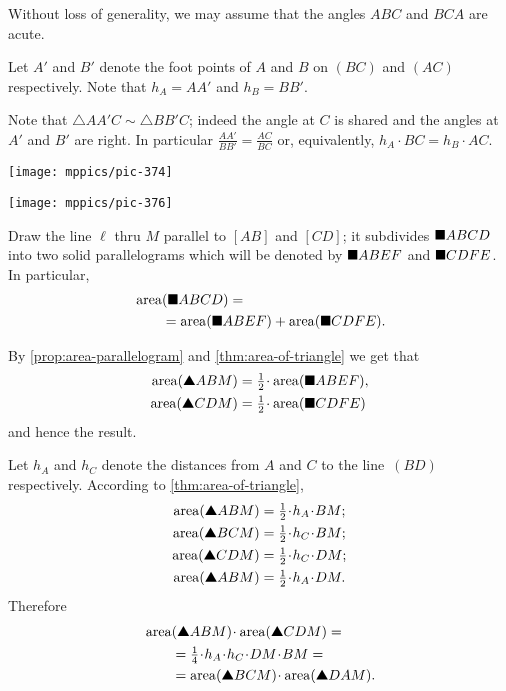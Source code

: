\begin{multicols}{2}
{}

Without loss of generality, we may assume that the angles $ABC$ and $BCA$ are acute.

Let $A'$ and $B'$ denote the foot points of $A$ and $B$ on $(BC)$ and $(AC)$ respectively.
Note that $h_A=AA'$ and $h_B=BB'$.

Note that $\triangle AA'C\sim \triangle BB'C$;
indeed the angle at $C$ is shared and the angles at $A'$ and $B'$ are right.
In particular
$\frac{AA'}{BB'}=\frac{AC}{BC}$
or, equivalently, $h_A\cdot BC=h_B\cdot AC$.

\begin{Figure}
\vskip-0mm
\begin{minipage}{.49\textwidth}
\centering
\texttt{[image: mppics/pic-374]}
\end{minipage}
\hfill
\begin{minipage}{.49\textwidth}
\centering
\texttt{[image: mppics/pic-376]}
\end{minipage}
\end{Figure}

Draw the line $\ell$ 
thru $M$ parallel to $[AB]$ and $[CD]$;
it subdivides $\blacksquare ABCD$ into two solid parallelograms
which will be denoted by
$\blacksquare ABEF$ and
$\blacksquare CDFE$.
In particular,
\begin{align*}
&\mathop{\rm area}\nolimits(\blacksquare ABCD)=
\\
&\qquad=
\mathop{\rm area}\nolimits(\blacksquare ABEF)+\mathop{\rm area}\nolimits(\blacksquare CDFE).
\end{align*}

By \ref{prop:area-parallelogram} and \ref{thm:area-of-triangle} we get that 
\begin{align*}
\area(\solidtriangle ABM)&=\tfrac12\cdot\area(\solidsquare ABEF),
\\
\area(\solidtriangle CDM)&=\tfrac12\cdot\area(\solidsquare CDFE)
\end{align*}
and hence the result.

Let $h_A$ and $h_C$ denote the distances from $A$ and $C$ to the line~$(BD)$ respectively.
According to \ref{thm:area-of-triangle},
\begin{align*}
\area(\solidtriangle ABM)&=\tfrac12\cdot h_A\cdot BM;
\\
\area(\solidtriangle BCM)&=\tfrac12\cdot h_C\cdot BM;
\\
\area(\solidtriangle CDM)&=\tfrac12\cdot h_C\cdot DM;
\\
\area(\solidtriangle ABM)&=\tfrac12\cdot h_A\cdot DM.
\end{align*}
Therefore
\begin{align*}
&\area(\solidtriangle ABM)\cdot \area(\solidtriangle CDM)=
\\
&\qquad=\tfrac14 \cdot h_A\cdot h_C\cdot DM\cdot BM=
\\
&\qquad=\area(\solidtriangle BCM)\cdot \area(\solidtriangle DAM).
\end{align*}


\end{multicols}
